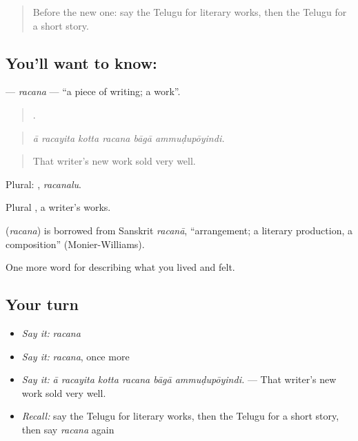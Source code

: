 \label{lesson:TE-C540-racana}



\begin{quote}
Before the new one: say the Telugu for literary works, then the Telugu for a short story.
\end{quote}

\subsection*{You'll want to know: }
\textbf{} — \emph{racana} — \textquotedblleft{}a piece of writing; a work\textquotedblright{}.

\begin{quote}
     .
\end{quote}

\begin{quote}
\emph{ā racayita kotta racana bāgā ammuḍupōyindi.}
\end{quote}

\begin{quote}
That writer's new work sold very well.
\end{quote}

Plural: , \emph{racanalu}.

Plural , a writer's works.

\begin{cousinweb}
\textbf{} (\emph{racana}) is borrowed from Sanskrit \emph{racanā}, \textquotedblleft{}arrangement; a literary production, a composition\textquotedblright{} (Monier-Williams).
\end{cousinweb}

\begin{grammarlens}[title={What you've built}]
One more word for describing what you lived and felt.
\end{grammarlens}

\subsection*{Your turn}
\begin{itemize}
\raggedright
  \item \emph{Say it:} \emph{racana}
  \item \emph{Say it:} \emph{racana}, once more
  \item \emph{Say it:} \emph{ā racayita kotta racana bāgā ammuḍupōyindi.} — That writer's new work sold very well.
  \item \emph{Recall:} say the Telugu for literary works, then the Telugu for a short story, then say \emph{racana} again
\end{itemize}

